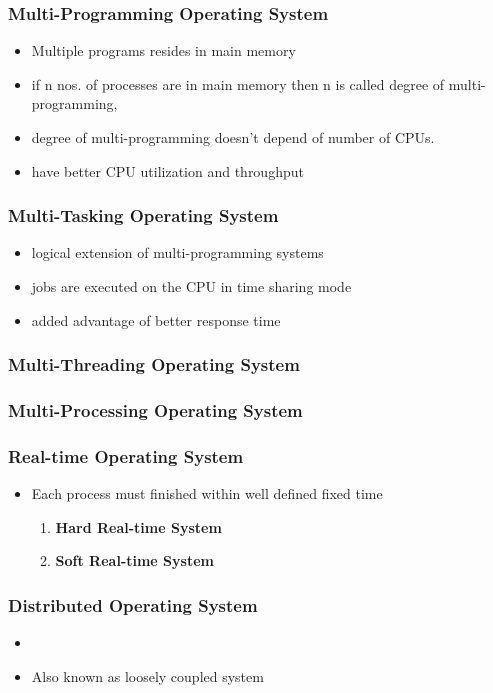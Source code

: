 \subsubsection{Multi-Programming Operating System}
\begin{itemize}
	\item Multiple programs resides in main memory
	\item if n nos. of processes are in main memory then n is called degree of multi-programming,
	\item degree of multi-programming doesn't depend of number of CPUs.
	\item have better CPU utilization and throughput
\end{itemize}
\subsubsection{Multi-Tasking Operating System}
\begin{itemize}
	\item logical extension of multi-programming systems
	\item jobs are executed on the CPU in time sharing mode
	\item added advantage of better response time
\end{itemize}
\subsubsection{Multi-Threading Operating System}
\subsubsection{Multi-Processing Operating System}
\subsubsection{Real-time Operating System}
\begin{itemize}
	\item Each process must finished within well defined fixed time
	\begin{enumerate}
		\item \textbf{Hard Real-time System}
		\item \textbf{Soft Real-time System}
	\end{enumerate}
\end{itemize}
\subsubsection{Distributed Operating System}
\begin{itemize}
	\item 
	\item Also known as loosely coupled system
\end{itemize}
